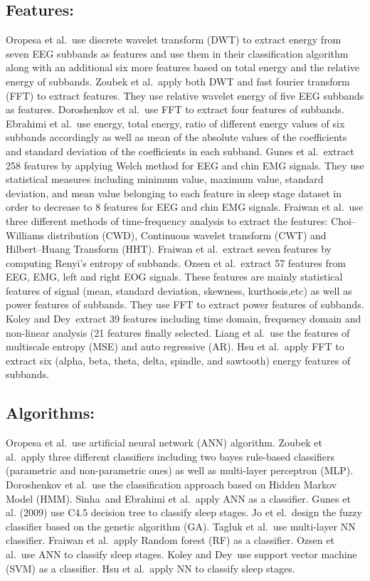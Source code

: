 \documentclass[12pt,letterpaper]{article}
\begin{document}
\subsection*{ Features:}

Oropesa et al.\ use discrete wavelet transform (DWT) to extract energy from seven EEG subbands as features and use them in their classification algorithm along with an additional six more features based on total energy and the relative energy of subbands. Zoubek et al.\ apply both DWT and fast fourier transform (FFT) to extract features. They use relative wavelet energy of five EEG subbands as features. Doroshenkov et al.\ use FFT to extract four features of subbands. Ebrahimi et al.\ use energy, total energy, ratio of different energy values of six subbands accordingly as well as mean of the absolute values of the coefficients and standard deviation of the coefficients in each subband. Gunes et al.\ extract 258 features by applying Welch method for EEG and chin EMG signals. They use statistical measures including minimum value, maximum value, standard deviation, and mean value belonging to each feature in sleep stage dataset in order to decrease to 8 features for EEG and chin EMG signals. Fraiwan et al.\ use three different methods of time-frequency analysis to extract the features: Choi–Williams distribution (CWD), Continuous wavelet transform (CWT) and Hilbert–Huang Transform (HHT). Fraiwan et al.\ extract seven features by computing Renyi’s entropy of subbands. Ozsen et al.\ extract 57 features from EEG, EMG, left and right EOG signals. These features are mainly statistical features of signal (mean, standard deviation, skewness, kurthosis,etc) as well as power features of subbands. They use FFT to extract power features of subbands. Koley and Dey\ extract 39 features including time domain, frequency domain and non-linear analysis (21 features finally selected. Liang et al.\ use the features of multiscale entropy (MSE) and auto regressive (AR). Hsu et al.\ apply FFT to extract six (alpha, beta, theta, delta, spindle, and sawtooth) energy features of subbands.

\subsection*{ Algorithms:}

Oropesa et al.\ use artificial neural network (ANN) algorithm. Zoubek et al.\ apply three different classifiers including two bayes rule-based classifiers (parametric and non-parametric ones) as well as multi-layer perceptron (MLP). Doroshenkov et al.\ use the classification approach based on Hidden Markov Model (HMM). Sinha\ and Ebrahimi et al.\ apply ANN as a classifier. Gunes et al. (2009) use C4.5 decision tree to classify sleep stages. Jo et el.\ design the fuzzy classifier based on the genetic algorithm (GA). Tagluk et al.\ use multi-layer NN classifier. Fraiwan et al.\ apply Random forest (RF) as a classifier. Ozsen et al.\ use ANN to classify sleep stages. Koley and Dey\ use support vector machine (SVM) as a classifier. Hsu et al.\ apply NN to classify sleep stages. 
\end{document}
